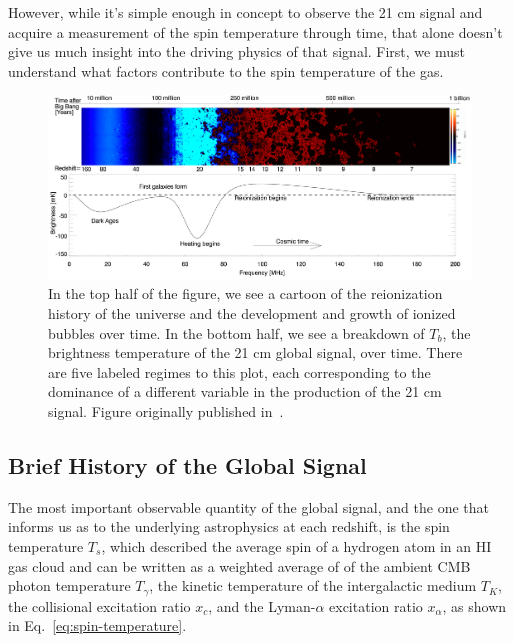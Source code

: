 However, while it's simple enough in concept to observe the 21 cm signal and 
acquire a measurement of the spin temperature through time, that alone doesn't 
give us much insight into the driving physics of that signal. First, we must 
understand what factors contribute to the spin temperature of the gas.

\begin{figure}
    \begin{center}
    \includegraphics[width=\linewidth]{global_signal.png}
    \end{center}
    \caption{
        In the top half of the figure, we see a cartoon of the reionization 
        history of the universe and the development and growth of ionized 
        bubbles over time. In the bottom half, we see a breakdown of $T_b$, the 
        brightness temperature of the 21 cm global signal, over time. There are 
        five labeled regimes to this plot, each corresponding to the dominance 
        of a different variable in the production of the 21 cm signal. Figure 
        originally published in~\citealp{pritchard-loeb2012}.
    }
    \label{fig:global-signal}
\end{figure}

\subsection{Brief History of the Global Signal}

The most important observable quantity of the global signal, and the one that 
informs us as to the underlying astrophysics at each redshift, is the spin 
temperature $T_s$, which described the average spin of a hydrogen atom in an HI 
gas cloud and can be written as a weighted average of of the ambient CMB photon 
temperature $T_\gamma$, the kinetic temperature of the intergalactic medium 
$T_K$, the collisional excitation ratio $x_c$, and the Lyman-$\alpha$ 
excitation ratio $x_\alpha$, as shown in Eq.~\eqref{eq:spin-temperature}.

